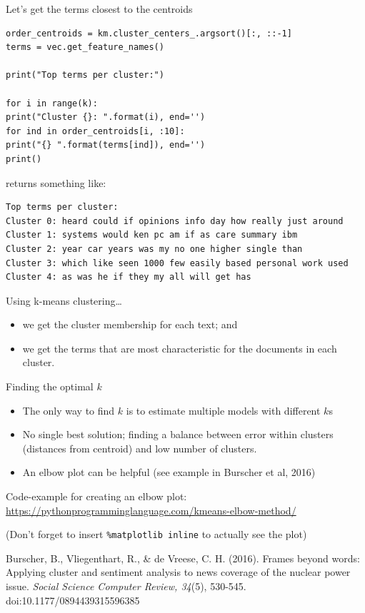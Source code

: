 \documentclass[compress]{beamer}
\begin{document}
\begin{frame}{Let's get the terms closest to the centroids}
\begin{lstlisting}
order_centroids = km.cluster_centers_.argsort()[:, ::-1]
terms = vec.get_feature_names()

print("Top terms per cluster:")

for i in range(k):
print("Cluster {}: ".format(i), end='')
for ind in order_centroids[i, :10]:
print("{} ".format(terms[ind]), end='')
print()
\end{lstlisting}
\pause
returns something like:

\begin{lstlisting}
Top terms per cluster:
Cluster 0: heard could if opinions info day how really just around 
Cluster 1: systems would ken pc am if as care summary ibm 
Cluster 2: year car years was my no one higher single than 
Cluster 3: which like seen 1000 few easily based personal work used 
Cluster 4: as was he if they my all will get has 
\end{lstlisting}
\end{frame}


\begin{frame}{Using k-means clustering\ldots}
\begin{itemize}
\item we get the cluster membership for each text; and
\item we get the terms that are most characteristic for the documents in each cluster.
\end{itemize}
\end{frame}

\begin{frame}{Finding the optimal $k$}

\begin{itemize}
\item The only way to find $k$ is to estimate multiple models with different $k$s
\item No single best solution; finding a balance between error within clusters (distances from centroid) and low number of clusters.
\item An elbow plot can be helpful (see example in Burscher et al, 2016)
\end{itemize}

\pause

\footnotesize 
Code-example for creating an elbow plot:
\url{https://pythonprogramminglanguage.com/kmeans-elbow-method/}

(Don't forget to insert \texttt{\%matplotlib inline} to actually see the plot)


\tiny{Burscher, B., Vliegenthart, R., \& de Vreese, C. H. (2016). Frames beyond words: Applying cluster and sentiment analysis to news coverage of the
nuclear power issue.\textit{ Social Science Computer Review, 34}(5), 530-545. doi:10.1177/0894439315596385}
\end{frame}
\end{document}
